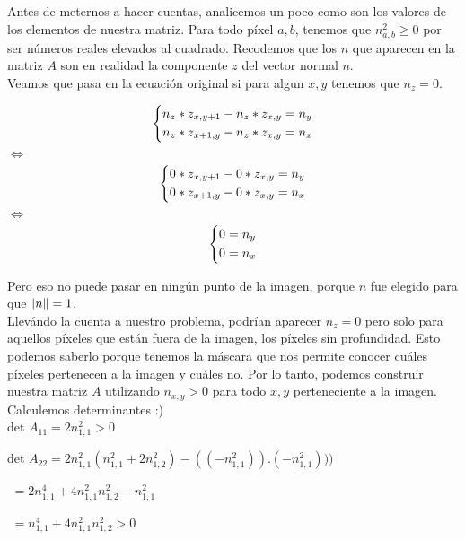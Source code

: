 Antes de meternos a hacer cuentas, analicemos un poco como son los valores de los elementos de nuestra matriz. Para todo píxel $a, b$, tenemos que $n_{a, b}^2 \geq 0$ por ser números reales elevados al cuadrado. Recodemos que los $n$ que aparecen en la matriz $A$ son en realidad la componente $z$ del vector normal $n$. \\

Veamos que pasa en la ecuación original si para algun $x,y$ tenemos que $n_{z} = 0$.

\begin{center}
\[\begin{dcases}
        n_{z} * z_{x, y+1} - n_{z} *  z_{x, y} = n_{y}  \\
        n_{z} * z_{x+1, y} - n_{z} *  z_{x, y} = n_{x}
    \end{dcases}
\]
$\iff$
\[\begin{dcases}
        0 * z_{x, y+1} - 0 *  z_{x, y} = n_{y}  \\
        0 * z_{x+1, y} - 0 *  z_{x, y} = n_{x}
    \end{dcases}
\]
$\iff$
\[\begin{dcases}
        0 = n_{y}  \\
        0 = n_{x}
    \end{dcases}
\]
\end{center}

Pero eso no puede pasar en ningún punto de la imagen, porque $n$ fue elegido para que $\norm{n} = 1$. \\

Llevándo la cuenta a nuestro problema, podrían aparecer $n_z = 0$ pero solo para aquellos píxeles que están fuera de la imagen, los píxeles sin profundidad. Esto podemos saberlo porque tenemos la máscara que nos permite conocer cuáles píxeles pertenecen a la imagen y cuáles no. Por lo tanto, podemos construir nuestra matriz $A$ utilizando $n_{x, y} > 0$ para todo $x, y$ perteneciente a la imagen. \\

Calculemos determinantes :) \\

det $A_{11} = 2 n_{1,1}^2 > 0$ \\

{\setlength{\baselineskip}{2em}
det $A_{22} = 2n_{1,1}^2 (n_{1,1}^2 + 2n_{1,2}^2) - ((-n_{1,1}^2)).(-n_{1,1}^2))) $

$ $ \hspace{30pt} $= 2n_{1,1}^4 + 4 n_{1,1}^2 n_{1,2}^2 - n_{1,1}^2$

$ $ \hspace{30pt} $= n_{1,1}^4 + 4 n_{1,1}^2 n_{1,2}^2 > 0$

$ $ \hspace{30pt}
}

